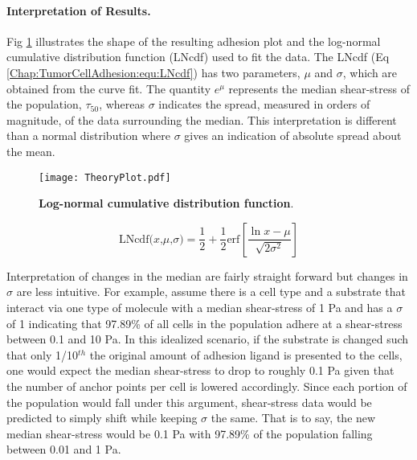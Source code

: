 \paragraph{Interpretation of Results.}Fig \ref{Chap:TumorCellAdhesion:fig:logNorm} illustrates the shape of the resulting adhesion plot and the log-normal cumulative distribution function (LNcdf) used to fit the data. The LNcdf (Eq \ref{Chap:TumorCellAdhesion:equ:LNcdf}) has two parameters, $\mu$ and $\sigma$, which are obtained from the curve fit. The quantity $e^{\mu}$ represents the median shear-stress of the population, $\tau_{50}$, whereas $\sigma$ indicates the spread, measured in orders of magnitude, of the data surrounding the median. This interpretation is different than a normal distribution where $\sigma$ gives an indication of absolute spread about the mean.

\begin{figure}[!t]
\centering
\texttt{[image: TheoryPlot.pdf]}
\caption{\textbf{Log-normal cumulative distribution function}.}
\label{Chap:TumorCellAdhesion:fig:logNorm}
\end{figure}

\begin{equation}
\textrm{LNcdf($x$,$\mu$,$\sigma$)} = \frac{1}{2} + \frac{1}{2}\textrm{erf}\left[ \frac{\ln{x} - \mu}{\sqrt{2 \sigma^{2}}}\right] 
\label{Chap:TumorCellAdhesion:equ:LNcdf}
\end{equation}

Interpretation of changes in the median are fairly straight forward but changes in $\sigma$ are less intuitive. For example, assume there is a cell type and a substrate that interact via one type of molecule with a median shear-stress of 1 Pa and has a $\sigma$ of 1 indicating that 97.89\% of all cells in the population adhere at a shear-stress between 0.1 and 10 Pa. In this idealized scenario, if the substrate is changed such that only 1/10$^{th}$ the original amount of adhesion ligand is presented to the cells, one would expect the median shear-stress to drop to roughly 0.1 Pa given that the number of anchor points per cell is lowered accordingly. Since each portion of the population would fall under this argument, shear-stress data would be predicted to simply shift while keeping $\sigma$ the same. That is to say, the new median shear-stress would be 0.1 Pa with 97.89\% of the population falling between 0.01 and 1 Pa.

